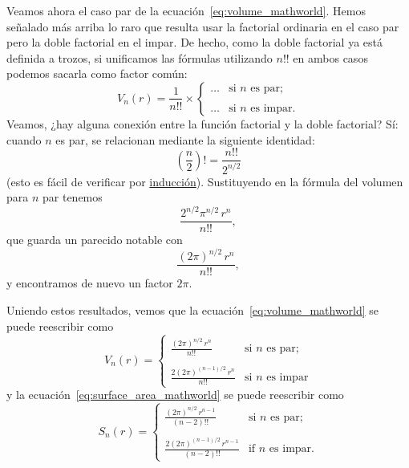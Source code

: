 Veamos ahora el caso par de la ecuación~\eqref{eq:volume_mathworld}. Hemos señalado más arriba lo raro que resulta usar la factorial ordinaria en el caso par pero la doble factorial en el impar. De hecho, como la doble factorial ya está definida a trozos, si unificamos las fórmulas utilizando $n!!$ en ambos casos podemos sacarla como factor común:
\[
V_n(r) = \frac{1}{n!!}\times \begin{cases}
\ldots & \text{si } n \text{ es par}; \\ \\
 \ldots & \text{si } n \text{ es impar}.
 \end{cases}
\]
Veamos, ¿hay alguna conexión entre la función factorial y la doble factorial? Sí: cuando $n$ es par, se relacionan mediante la siguiente identidad:
\[ \left(\frac{n}{2}\right)! = \frac{n!!}{2^{n/2}} \]
(esto es fácil de verificar por \href{https://es.wikipedia.org/wiki/Inducción_matemática}{inducción}). Sustituyendo en la fórmula del volumen para $n$ par tenemos
\[ \frac{2^{n/2}\pi^{n/2}\,r^n}{n!!}, \]
que guarda un parecido notable con
\[ \frac{(2\pi)^{n/2}\,r^n}{n!!}, \]
y encontramos de nuevo un factor $2\pi$.

Uniendo estos resultados, vemos que la ecuación~\eqref{eq:volume_mathworld} se puede reescribir como
\begin{equation}
\label{eq:volume_2pi}
V_n(r) = \begin{cases}
 \displaystyle \frac{(2\pi)^{n/2}\,r^n}{n!!} & \text{si } n \text{ es par}; \\ \\
 \displaystyle \frac{2(2\pi)^{(n-1)/2}\,r^n}{n!!} & \text{si } n \text{ es impar}
 \end{cases}
\end{equation}
y la ecuación~\eqref{eq:surface_area_mathworld} se puede reescribir como
\begin{equation}
\label{eq:surface_area_2pi}
S_n(r) = \begin{cases}
\displaystyle \frac{(2\pi)^{n/2}\,r^{n-1}}{(n-2)!!} & \text{si } n \text{ es par}; \\ \\
\displaystyle \frac{2(2\pi)^{(n-1)/2}\,r^{n-1}}{(n-2)!!} & \text{if } n \text{ es impar.}
\end{cases}
\end{equation}

